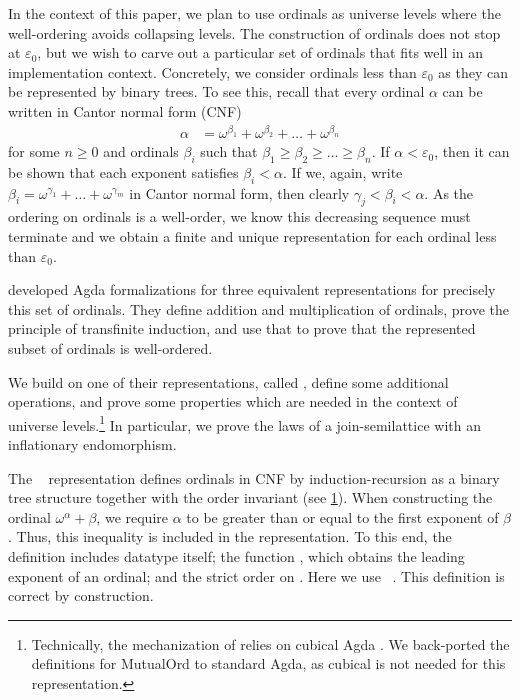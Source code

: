 \documentclass[manuscript,screen,review,anonymous]{acmart}
\begin{document}
In the context of this paper, we plan to use
ordinals as universe levels where the well-ordering avoids collapsing
levels. The construction of ordinals does not stop at $\varepsilon_0$,
but we wish to carve out a particular set of ordinals that fits
well in an implementation context. Concretely, we consider ordinals
less than $\varepsilon_0$ as they can be represented by binary trees.
To see this, recall that every ordinal $\alpha$ can be written in
Cantor normal form (CNF)
\begin{align*}
  \alpha &= \omega^{\beta_1} + \omega^{\beta_2}  + \dots + \omega^{\beta_n}
\end{align*}
for some $n\ge0$ and ordinals $\beta_i$ such that
$\beta_1\ge\beta_2\ge \dots \ge \beta_n$. If $\alpha < \varepsilon_0$,
then it can be shown that each exponent satisfies $\beta_i < \alpha$.
If we, again, write $\beta_i = \omega^{\gamma_1} + \dots +
\omega^{\gamma_m}$ in Cantor normal form, then clearly $\gamma_j <
\beta_i < \alpha$. As the ordering on ordinals is a well-order, we
know this decreasing sequence must terminate and we obtain a finite 
and unique representation for each ordinal less than $\varepsilon_0$.

\citet{DBLP:conf/cpp/ForsbergXG20} developed Agda
formalizations for three equivalent representations for precisely this
set of ordinals. They define addition and multiplication of ordinals,
prove the principle of transfinite induction, and use that to prove
that the represented subset of ordinals is well-ordered.

We build on one of their representations, called {\AMutualOrd}, define
some additional operations, and prove some properties which are needed
in the context of universe levels.\footnote{Technically, the
mechanization of \citet{DBLP:conf/cpp/ForsbergXG20} relies on
cubical Agda \cite{10.1145/3341691}. We back-ported the definitions for
MutualOrd to standard Agda, as cubical is not needed for this representation.}
In particular, we prove the laws of a join-semilattice with an
inflationary endomorphism.

\begin{figure}[tp]
  \begin{minipage}[t]{0.52\linewidth}
    \OMDecl \OMDef
  \end{minipage}
  \begin{minipage}[t]{0.37\linewidth}
    \OfstDef \OOrdDef
  \end{minipage}
  
  \caption{\AMutualOrd}
  \label{fig:def-mutualord}
\end{figure}
The \AMutualOrd~ representation defines ordinals in CNF by
induction-recursion as a binary tree structure 
together with the order invariant (see \cref{fig:def-mutualord}).
When constructing the ordinal $ω^\alpha + \beta$, 
we require $\alpha$ to be greater than or equal to the first exponent of $\beta$.
Thus, this inequality is included in the representation. To this end,
the definition includes datatype {\AMutualOrd} itself; the function , 
which obtains the leading exponent of an ordinal; and the strict order
on {\AMutualOrd}. 
Here we use \OGtDef~. 
This definition is correct by construction.
\end{document}
